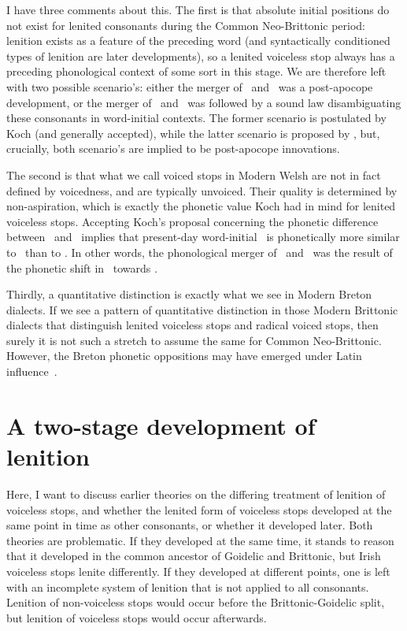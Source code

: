 I have three comments about this. The first is that absolute initial positions do not exist for lenited consonants during the Common Neo-Brittonic period: lenition exists as a feature of the preceding word (and syntactically conditioned types of lenition are later developments), so a lenited voiceless stop always has a preceding phonological context of some sort in this stage.  We are therefore left with two possible scenario's: either the merger of \xD\ and \lT\ was a post-apocope development, or the merger of \xD\ and \lT\ was followed by a sound law disambiguating these consonants in word-initial contexts. The former scenario is postulated by Koch (and generally accepted), while the latter scenario is proposed by \textcite{harvey_aspects_1984}, but, crucially, both scenario's are implied to be post-apocope innovations.

The second is that what we call voiced stops in Modern Welsh are not in fact defined by voicedness, and are typically unvoiced. Their quality is determined by non-aspiration, which is exactly the phonetic value Koch had in mind for lenited voiceless stops. Accepting Koch's proposal concerning the phonetic difference between \lT\ and \xD\ implies that present-day word-initial \xD\ is phonetically more similar to \lT\ than to \xD. In other words, the phonological merger of \lT\ and \xD\ was the result of the phonetic shift in \xD\ towards \lT.

Thirdly, a quantitative distinction is exactly what we see in Modern Breton dialects. If we see a pattern of quantitative distinction in those Modern Brittonic dialects that distinguish lenited voiceless stops and radical voiced stops, then surely it is not such a stretch to assume the same for Common Neo-Brittonic. However, the Breton phonetic oppositions may have emerged under Latin influence~\autocite[31]{schrijver_old_2011}.
 

\section{A two-stage development of lenition}
Here, I want to discuss earlier theories on the differing treatment of lenition of voiceless stops, and whether the lenited form of voiceless stops developed at the same point in time as other consonants, or whether it developed later. Both theories are problematic. If they developed at the same time, it stands to reason that it developed in the common ancestor of Goidelic and Brittonic, but Irish voiceless stops lenite differently. If they developed at different points, one is left with an incomplete system of lenition that is not applied to all consonants. Lenition of non-voiceless stops would occur before the Brittonic-Goidelic split, but lenition of voiceless stops would occur afterwards. 

